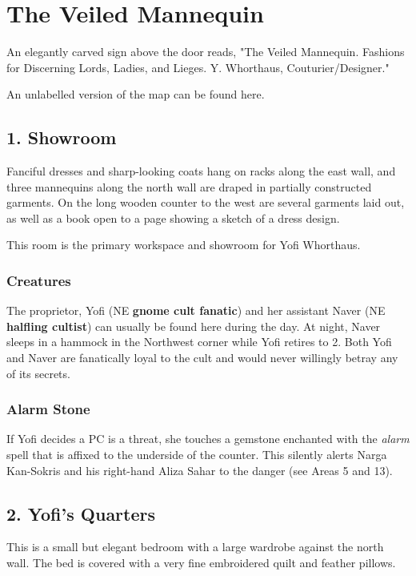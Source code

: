 \documentclass[10pt,a4paper,twoside,bg=print,twocolumn,openany,nodeprecatedcode]{dndbook}
\begin{document}
\section{The Veiled Mannequin}
An elegantly carved sign above the door reads, "The Veiled Mannequin. Fashions for Discerning Lords, Ladies, and Lieges. Y. Whorthaus, Couturier/Designer."

An unlabelled version of the map can be found here.

\subsection{1. Showroom}
\begin{DndReadAloud}{}
Fanciful dresses and sharp-looking coats hang on racks along the east wall, and three mannequins along the north wall are draped in partially constructed garments. On the long wooden counter to the west are several garments laid out, as well as a book open to a page showing a sketch of a dress design.

\end{DndReadAloud}

This room is the primary workspace and showroom for Yofi Whorthaus.

\subsubsection{Creatures}
The proprietor, Yofi (NE \textbf{gnome cult fanatic}) and her assistant Naver (NE \textbf{halfling cultist}) can usually be found here during the day. At night, Naver sleeps in a hammock in the Northwest corner while Yofi retires to 2. Both Yofi and Naver are fanatically loyal to the cult and would never willingly betray any of its secrets.

\subsubsection{Alarm Stone}
If Yofi decides a PC is a threat, she touches a gemstone enchanted with the \textit{alarm} spell that is affixed to the underside of the counter. This silently alerts Narga Kan-Sokris and his right-hand Aliza Sahar to the danger (see Areas 5 and 13).

\subsection{2. Yofi's Quarters}
\begin{DndReadAloud}{}
This is a small but elegant bedroom with a large wardrobe against the north wall. The bed is covered with a very fine embroidered quilt and feather pillows.

\end{DndReadAloud}
\end{document}
